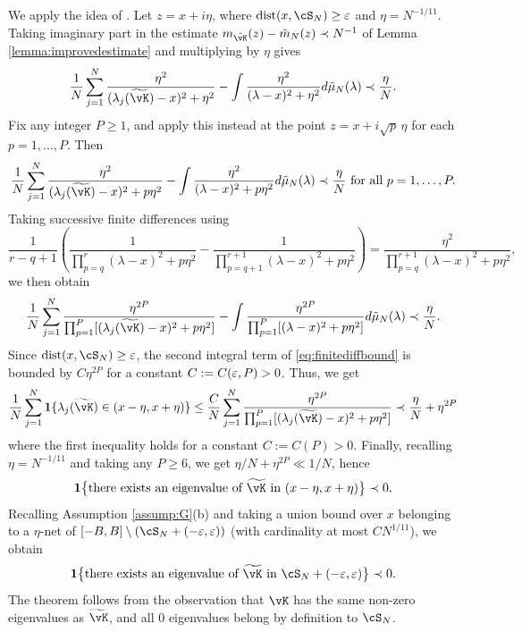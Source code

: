 \begin{proof-of-theorem}[\ref{thm:no_outlier}]
We apply the idea of \cite[Section 6]{bai1998no}. Let $z=x+i\eta$, where
$\dist{x,\cS_N} \geq \eps$ and $\eta=N^{-1/11}$.
Taking imaginary part in the estimate $m_{\tilde \vK}(z)-\tilde m_N(z) \prec
N^{-1}$ of Lemma \ref{lemma:improvedestimate} and multiplying by
$\eta$ gives
\[\frac{1}{N}\sum_{j=1}^N \frac{\eta^2}{(\lambda_j(\widetilde \vK)-x)^2+\eta^2}
-\int \frac{\eta^2}{(\lambda-x)^2+\eta^2} d\tilde\mu_N(\lambda) \prec
\frac{\eta}{N}.\]
Fix any integer $P \geq 1$, and apply this instead
at the point $z=x+i\sqrt{p}\,\eta$ for each $p=1,\ldots,P$. Then
\[\frac{1}{N}\sum_{j=1}^N \frac{\eta^2}{(\lambda_j(\widetilde \vK)-x)^2+p\eta^2}
-\int \frac{\eta^2}{(\lambda-x)^2+p\eta^2} d\tilde\mu_N(\lambda) \prec
\frac{\eta}{N} \text{ for all } p=1,\ldots,P.\]
Taking successive finite differences using
\[\frac{1}{r-q+1}\left(\frac{1}{\prod_{p=q}^r (\lambda-x)^2+p\eta^2}
-\frac{1}{\prod_{p=q+1}^{r+1} (\lambda-x)^2+p\eta^2}\right)
=\frac{\eta^2}{\prod_{p=q}^{r+1} (\lambda-x)^2+p\eta^2},\]
we then obtain
\begin{equation}\label{eq:finitediffbound}
\frac{1}{N}\sum_{j=1}^N \frac{\eta^{2P}}{\prod_{p=1}^P
[(\lambda_j(\widetilde \vK)-x)^2+p\eta^2]}
-\int \frac{\eta^{2P}}{\prod_{p=1}^P[(\lambda-x)^2+p\eta^2]}
d\tilde\mu_N(\lambda) \prec \frac{\eta}{N}.
\end{equation}
Since $\dist{x,\cS_N} \geq \eps$, the second integral term of
\eqref{eq:finitediffbound} is bounded by $C\eta^{2P}$ for a
constant $C:=C(\varepsilon,P)>0$. Thus, we get
\[\frac{1}{N}\sum_{j=1}^N \bI\{\lambda_j(\widetilde \vK) \in (x-\eta,x+\eta)\}
\leq \frac{C}{N}\sum_{j=1}^N \frac{\eta^{2P}}{\prod_{p=1}^P
[(\lambda_j(\widetilde \vK)-x)^2+p\eta^2]} \prec \frac{\eta}{N}+\eta^{2P}\]
where the first inequality holds
for a constant $C:=C(P)>0$. Finally, recalling $\eta=N^{-1/11}$ and taking
any $P \geq 6$, we get $\eta/N+\eta^{2P} \ll 1/N$, hence
\[\bI\big\{\text{there exists an eigenvalue of }\widetilde \vK
\text{ in } (x-\eta,x+\eta)\big\} \prec 0.\]
Recalling Assumption \ref{assump:G}(b) and
taking a union bound over $x$ belonging to a $\eta$-net of
$[-B,B] \setminus (\cS_N+(-\eps,\eps))$ (with cardinality at most $CN^{1/11}$),
we obtain
\[\bI\big\{\text{there exists an eigenvalue of }\widetilde \vK
\text{ in } \cS_N+(-\eps,\eps)\big\} \prec 0.\]
The theorem follows from the observation that $\vK$ has the same non-zero
eigenvalues as $\widetilde \vK$, and all 0 eigenvalues belong by definition to
$\cS_N$.
\end{proof-of-theorem}

